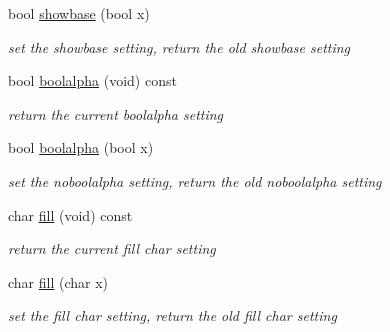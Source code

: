 \begin{DoxyCompactItemize}
bool \hyperlink{classhwlib_1_1ostream_af3c605a903254360ef4d1780c6879f9d}{showbase} (bool x)
\begin{DoxyCompactList}\small\item\em set the showbase setting, return the old showbase setting \end{DoxyCompactList}\item 
\mbox{\label{classhwlib_1_1ostream_a526d26e94776256b13280c5f2ad09401}} 
bool \hyperlink{classhwlib_1_1ostream_a526d26e94776256b13280c5f2ad09401}{boolalpha} (void) const
\begin{DoxyCompactList}\small\item\em return the current boolalpha setting \end{DoxyCompactList}\item 
\mbox{\label{classhwlib_1_1ostream_abde1d7adbad632abb1fc46120d0ddad2}} 
bool \hyperlink{classhwlib_1_1ostream_abde1d7adbad632abb1fc46120d0ddad2}{boolalpha} (bool x)
\begin{DoxyCompactList}\small\item\em set the noboolalpha setting, return the old noboolalpha setting \end{DoxyCompactList}\item 
\mbox{\label{classhwlib_1_1ostream_aa327ece163c85141c38b4fa257580fcf}} 
char \hyperlink{classhwlib_1_1ostream_aa327ece163c85141c38b4fa257580fcf}{fill} (void) const
\begin{DoxyCompactList}\small\item\em return the current fill char setting \end{DoxyCompactList}\item 
\mbox{\label{classhwlib_1_1ostream_ac2f24d5b094b81cfe61cf32ada5ee570}} 
char \hyperlink{classhwlib_1_1ostream_ac2f24d5b094b81cfe61cf32ada5ee570}{fill} (char x)
\begin{DoxyCompactList}\small\item\em set the fill char setting, return the old fill char setting \end{DoxyCompactList}\end{DoxyCompactItemize}
